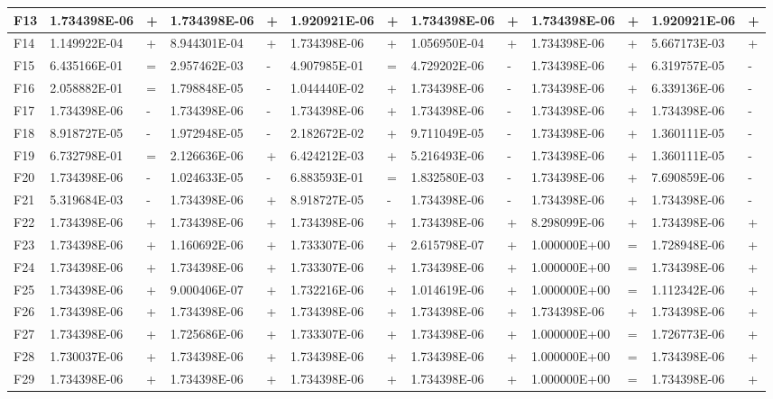 \documentclass{article} %
\begin{document}
\begin{tabular}{|p{0.3in}|p{0.6in}|p{0.1in}|p{0.6in}|p{0.2in}|p{0.6in}|p{0.2in}|p{0.6in}|p{0.2in}|p{0.6in}|p{0.2in}|p{0.6in}|p{0.2in}|}
F13 & 1.734398E-06 & + & 1.734398E-06 & + & 1.920921E-06 & + & 1.734398E-06 & + & 1.734398E-06 & + & 1.920921E-06 & + \\ \hline 
F14 & 1.149922E-04 & + & 8.944301E-04 & + & 1.734398E-06 & + & 1.056950E-04 & + & 1.734398E-06 & + & 5.667173E-03 & + \\ \hline 
F15 & 6.435166E-01 & = & 2.957462E-03 & - & 4.907985E-01 & = & 4.729202E-06 & - & 1.734398E-06 & + & 6.319757E-05 & - \\ \hline 
F16 & 2.058882E-01 & = & 1.798848E-05 & - & 1.044440E-02 & + & 1.734398E-06 & - & 1.734398E-06 & + & 6.339136E-06 & - \\ \hline 
F17 & 1.734398E-06 & - & 1.734398E-06 & - & 1.734398E-06 & + & 1.734398E-06 & - & 1.734398E-06 & + & 1.734398E-06 & - \\ \hline 
F18 & 8.918727E-05 & - & 1.972948E-05 & - & 2.182672E-02 & + & 9.711049E-05 & - & 1.734398E-06 & + & 1.360111E-05 & - \\ \hline 
F19 & 6.732798E-01 & = & 2.126636E-06 & + & 6.424212E-03 & + & 5.216493E-06 & - & 1.734398E-06 & + & 1.360111E-05 & - \\ \hline 
F20 & 1.734398E-06 & - & 1.024633E-05 & - & 6.883593E-01 & = & 1.832580E-03 & - & 1.734398E-06 & + & 7.690859E-06 & - \\ \hline 
F21 & 5.319684E-03 & - & 1.734398E-06 & + & 8.918727E-05 & - & 1.734398E-06 & - & 1.734398E-06 & + & 1.734398E-06 & - \\ \hline 
F22 & 1.734398E-06 & + & 1.734398E-06 & + & 1.734398E-06 & + & 1.734398E-06 & + & 8.298099E-06 & + & 1.734398E-06 & + \\ \hline 
F23 & 1.734398E-06 & + & 1.160692E-06 & + & 1.733307E-06 & + & 2.615798E-07 & + & 1.000000E+00 & = & 1.728948E-06 & + \\ \hline 
F24 & 1.734398E-06 & + & 1.734398E-06 & + & 1.733307E-06 & + & 1.734398E-06 & + & 1.000000E+00 & = & 1.734398E-06 & + \\ \hline 
F25 & 1.734398E-06 & + & 9.000406E-07 & + & 1.732216E-06 & + & 1.014619E-06 & + & 1.000000E+00 & = & 1.112342E-06 & + \\ \hline 
F26 & 1.734398E-06 & + & 1.734398E-06 & + & 1.734398E-06 & + & 1.734398E-06 & + & 1.734398E-06 & + & 1.734398E-06 & + \\ \hline 
F27 & 1.734398E-06 & + & 1.725686E-06 & + & 1.733307E-06 & + & 1.734398E-06 & + & 1.000000E+00 & = & 1.726773E-06 & + \\ \hline 
F28 & 1.730037E-06 & + & 1.734398E-06 & + & 1.734398E-06 & + & 1.734398E-06 & + & 1.000000E+00 & = & 1.734398E-06 & + \\ \hline 
F29 & 1.734398E-06 & + & 1.734398E-06 & + & 1.734398E-06 & + & 1.734398E-06 & + & 1.000000E+00 & = & 1.734398E-06 & + \\ \hline 
\end{tabular}
\end{document}
